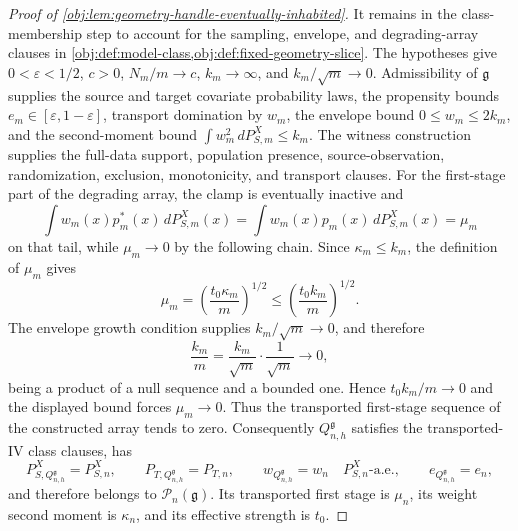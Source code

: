 \documentclass[11pt]{article}
\begin{document}
\begin{proof}[Proof of \cref{obj:lem:geometry-handle-eventually-inhabited}]
It remains in the class-membership step to account for the sampling, envelope, and degrading-array clauses in \cref{obj:def:model-class,obj:def:fixed-geometry-slice}. The hypotheses give \(0<\varepsilon<1/2\), \(c>0\), \(N_m/m\to c\), \(k_m\to\infty\), and \(k_m/\sqrt m\to0\). Admissibility of \(\mathfrak g\) supplies the source and target covariate probability laws, the propensity bounds \(e_m\in[\varepsilon,1-\varepsilon]\), transport domination by \(w_m\), the envelope bound \(0\le w_m\le2k_m\), and the second-moment bound \(\int w_m^2\,dP_{S,m}^X\le k_m\). The witness construction supplies the full-data support, population presence, source-observation, randomization, exclusion, monotonicity, and transport clauses. For the first-stage part of the degrading array, the clamp is eventually inactive and
\[
\int w_m(x)p_m^\ast(x)\,dP_{S,m}^X(x)
=
\int w_m(x)p_m(x)\,dP_{S,m}^X(x)
=
\mu_m
\]
on that tail, while \(\mu_m\to0\) by the following chain. Since \(\kappa_m\le k_m\), the definition of \(\mu_m\) gives
\[
\mu_m=\left(\frac{t_0\kappa_m}{m}\right)^{1/2}\le\left(\frac{t_0k_m}{m}\right)^{1/2}.
\]
The envelope growth condition supplies \(k_m/\sqrt m\to0\), and therefore
\[
\frac{k_m}{m}=\frac{k_m}{\sqrt m}\cdot\frac{1}{\sqrt m}\longrightarrow 0,
\]
being a product of a null sequence and a bounded one. Hence \(t_0k_m/m\to0\) and the displayed bound forces \(\mu_m\to0\). Thus the transported first-stage sequence of the constructed array tends to zero. Consequently \(Q_{n,h}^{\mathfrak g}\) satisfies the transported-IV class clauses, has
\[
P_{S,Q_{n,h}^{\mathfrak g}}^X=P_{S,n}^X,
\qquad
P_{T,Q_{n,h}^{\mathfrak g}}=P_{T,n},
\qquad
w_{Q_{n,h}^{\mathfrak g}}=w_n\quad P_{S,n}^X\text{-a.e.},
\qquad
e_{Q_{n,h}^{\mathfrak g}}=e_n,
\]
and therefore belongs to \(\mathcal P_n(\mathfrak g)\). Its transported first stage is \(\mu_n\), its weight second moment is \(\kappa_n\), and its effective strength is \(t_0\). %


\end{proof}
\end{document}
